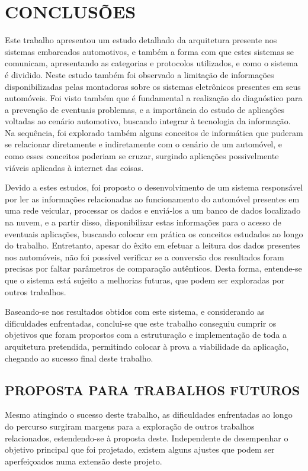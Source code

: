 \chapter{CONCLUSÕES}\label{CAP7}
Este trabalho apresentou um estudo detalhado da arquitetura presente nos sistemas embarcados automotivos, e também a forma com que estes sistemas se comunicam, apresentando as categorias e protocolos utilizados, e como o sistema é dividido. Neste estudo também foi observado a limitação de informações disponibilizadas pelas montadoras sobre os sistemas eletrônicos presentes em seus automóveis. Foi visto também que é fundamental a realização do diagnóstico para a prevenção de eventuais problemas, e a importância do estudo de aplicações voltadas ao cenário automotivo, buscando integrar à tecnologia da informação. Na sequência, foi explorado também alguns conceitos de informática que puderam se relacionar diretamente e indiretamente com o cenário de um automóvel, e como esses conceitos poderiam se cruzar, surgindo aplicações possivelmente viáveis aplicadas à internet das coisas.

Devido a estes estudos, foi proposto o desenvolvimento de um sistema responsável por ler as informações relacionadas ao funcionamento do automóvel presentes em uma rede veicular, processar os dados e enviá-los a um banco de dados localizado na nuvem, e a partir disso, disponibilizar estas informações para o acesso de eventuais aplicações, buscando colocar em prática os conceitos estudados ao longo do trabalho. Entretanto, apesar do êxito em efetuar a leitura dos dados presentes nos automóveis, não foi possível verificar se a conversão dos resultados foram precisas por faltar parâmetros de comparação autênticos. Desta forma, entende-se que o sistema está sujeito a melhorias futuras, que podem ser exploradas por outros trabalhos. 

Baseando-se nos resultados obtidos com este sistema, e considerando as dificuldades enfrentadas, conclui-se que este trabalho conseguiu cumprir os objetivos que foram propostos com a estruturação e implementação de toda a arquitetura pretendida, permitindo colocar à prova a viabilidade da aplicação, chegando ao sucesso final deste trabalho.

\section{PROPOSTA PARA TRABALHOS FUTUROS}
Mesmo atingindo o sucesso deste trabalho, as dificuldades enfrentadas ao longo do percurso surgiram margens para a exploração de outros trabalhos relacionados, estendendo-se à proposta deste. Independente de desempenhar o objetivo principal que foi projetado, existem alguns ajustes que podem ser aperfeiçoados numa extensão deste projeto.

